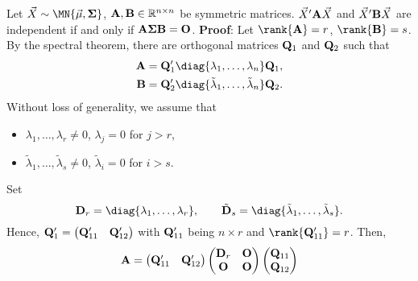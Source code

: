\begin{Theorem}{}{}
    Let $ \Vector{X}\sim \MN{\Vector{\mu},\Matrix{\Sigma}} $,
    $ \mathbf{A},\mathbf{B}\in\mathbb{R}^{n\times n} $ be symmetric matrices.
    $ \vec{X}'\mathbf{A}\vec{X} $ and $ \vec{X}'\mathbf{B}\vec{X} $
    are independent if and only if $ \mathbf{A\Sigma B}=\mathbf{O} $.
    \tcblower{}
    \textbf{Proof}: Let $ \rank{\Matrix{A}}=r $, $ \rank{\Matrix{B}}=s $. By
    the spectral theorem, there are orthogonal matrices $ \mathbf{Q}_1 $ and $ \mathbf{Q}_2 $
    such that
    \begin{align*}
        \Matrix{A} & =\Matrix{Q}_1'\diag{\lambda_1,\ldots,\lambda_n}\Matrix{Q}_1,                 \\
        \Matrix{B} & =\Matrix{Q}_2'\diag{\tilde{\lambda}_1,\ldots,\tilde{\lambda}_n}\Matrix{Q}_2.
    \end{align*}
    Without loss of generality, we assume that
    \begin{itemize}
        \item $ \lambda_1,\ldots,\lambda_r\ne 0 $, $ \lambda_j=0 $ for $ j>r $,
        \item $ \tilde{\lambda}_1,\ldots,\tilde{\lambda}_s\ne 0 $, $ \tilde{\lambda}_i=0 $ for $ i>s $.
    \end{itemize}
    Set
    \[ \Matrix{D}_r=\diag{\lambda_1,\ldots,\lambda_r},\qquad \tilde{\Matrix{D}}_s=\diag{\tilde{\lambda}_1,\ldots,\tilde{\lambda}_s}. \]
    Hence, $ \mathbf{Q}_1'=\begin{pmatrix}
            \mathbf{Q}_{11}' &
            \mathbf{Q}_{12}'
        \end{pmatrix} $ with $ \mathbf{Q}_{11}' $ being $ n\times r $
    and $ \rank{\Matrix{Q}_{11}'}=r $. Then,
    \begin{align*}
        \Matrix{A}
         & =\begin{pmatrix}
                \Matrix{Q}_{11}' & \Matrix{Q}_{12}'
            \end{pmatrix}\begin{pmatrix}
                             \Matrix{D}_r & \Matrix{O} \\
                             \Matrix{O}   & \Matrix{O}
                         \end{pmatrix}\begin{pmatrix}
                                          \Matrix{Q}_{11} \\
                                          \Matrix{Q}_{12}
                                      \end{pmatrix}     \\

\end{align*}
\end{Theorem}
